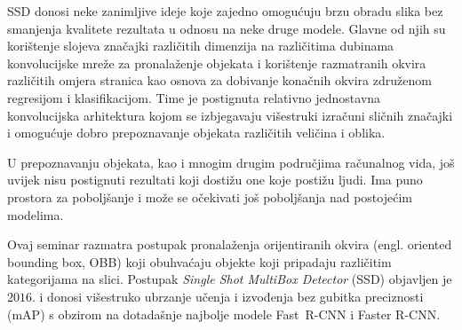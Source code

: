 \documentclass[utf8, seminar, numeric, lmodern]{feri}
\begin{document}
SSD donosi neke zanimljive ideje koje zajedno omogućuju brzu obradu slika bez smanjenja kvalitete rezultata u odnosu na neke druge modele. Glavne od njih su korištenje slojeva značajki različitih dimenzija na različitima dubinama konvolucijske mreže za pronalaženje objekata i korištenje razmatranih okvira različitih omjera stranica kao osnova za dobivanje konačnih okvira združenom regresijom i klasifikacijom. Time je postignuta relativno jednostavna konvolucijska arhitektura kojom se izbjegavaju višestruki izračuni sličnih značajki i omogućuje dobro prepoznavanje objekata različitih veličina i oblika. 

U prepoznavanju objekata, kao i mnogim drugim područjima računalnog vida, još uvijek nisu postignuti rezultati koji dostižu one koje postižu ljudi. Ima puno prostora za poboljšanje i može se očekivati još poboljšanja nad postojećim modelima.

\begin{sazetak}
	Ovaj seminar razmatra postupak pronalaženja orijentiranih okvira (engl. oriented bounding box, OBB) koji obuhvaćaju objekte koji pripadaju različitim kategorijama na slici. Postupak \emph{Single Shot MultiBox Detector} (SSD) objavljen je $2016$. i donosi višestruko ubrzanje učenja i izvođenja bez gubitka preciznosti (mAP) s obzirom na dotadašnje najbolje modele Fast R-CNN i Faster R-CNN. 
	
\end{sazetak}




\end{document}
